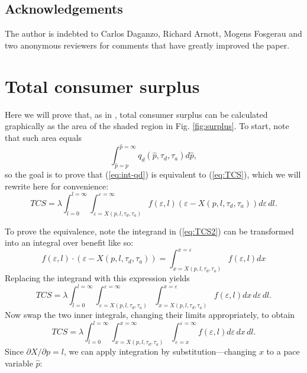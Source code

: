 \documentclass[preprint,authoryear]{elsarticle}
\newcommand{\taud}{\tau_d}
\newcommand{\taua}{\tau_a}
\newcommand{\ve}{\varepsilon}
\begin{document}
\subsection*{Acknowledgements}

The author is indebted to Carlos Daganzo, Richard Arnott, Mogens Fosgerau and two anonymous reviewers for comments that have greatly improved the paper.

\appendix

\section{Total consumer surplus}

Here we will prove that, as in \citet{Walters1961}, total consumer surplus can be calculated graphically as the area of the shaded region in Fig. \ref{fig:surplus}. To start, note that such area equals
\begin{equation}\label{eq:int-qd}
   \int_{\hat{p}=p}^{\hat{p}=\infty} q_d(\hat p,\taud,\taua)d\hat{p},
\end{equation}
so the goal is to prove that (\ref{eq:int-qd}) is equivalent to (\ref{eq:TCS}), which we will rewrite here for convenience:
\begin{equation}\label{eq:TCS2}
    TCS = \lambda \int_{l=0}^{l=\infty} \int_{\ve=X(p,l,\taud,\taua)}^{\ve=\infty} f(\ve, l)(\varepsilon-X(p,l,\taud,\taua)) d\ve\, dl.
\end{equation}

To prove the equivalence, note the integrand in (\ref{eq:TCS2}) can be transformed into an integral over benefit like so:
\begin{equation}
    f(\ve,l)\cdot(\ve - X(p,l,\taud,\taua))= \int_{x=X(p,l,\taud,\taua)}^{x=\ve} f(\ve,l) dx
\end{equation}
Replacing the integrand with this expression yields
\begin{equation}
	TCS = \lambda \int_{l=0}^{l=\infty}  \int_{\ve=X(p,l,\taud,\taua)}^{\ve=\infty} \int_{x=X(p,l,\taud,\taua)}^{x=\ve} f(\ve,l)dx\,d\ve\,  dl.
\end{equation}
Now swap the two inner integrals, changing their limits appropriately, to obtain
\begin{equation}
	TCS = \lambda \int_{l=0}^{l=\infty} \int_{x=X(p,l,\taud,\taua)}^{x=\infty} \int_{\ve=x}^{\ve=\infty} f(\ve,l)d\ve \, dx \, dl.
\end{equation}
Since $\partial X / \partial p=l$, we can apply integration by substitution---changing $x$ to a pace variable $\hat{p}$: 
\end{document}
